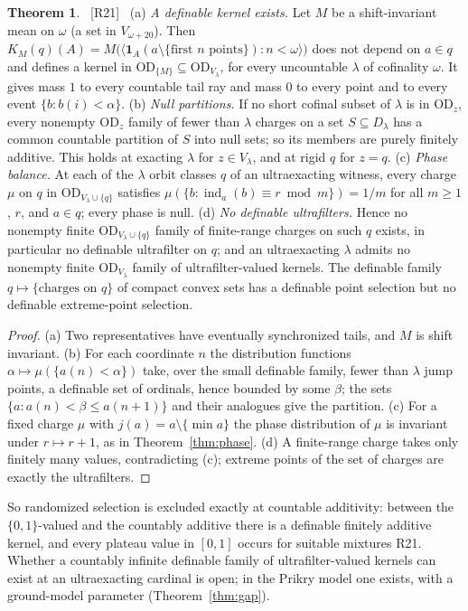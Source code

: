 \documentclass[11pt,letterpaper]{article}
\theoremstyle{definition}
\newtheorem{theorem}[definition]{Theorem}
\numberwithin{equation}{section}
\newcommand{\OD}{\mathrm{OD}}
\newcommand{\ch}{\operatorname{ind}}
\newcommand{\src}[1]{\unskip\ {\normalfont\small\sffamily\color{Olive}[#1]}\ }
\newcommand{\R}[1]{\textsf{R#1}}
\begin{document}
\begin{theorem}\label{thm:charges}\src{R21}
(a) \emph{A definable kernel exists.} Let $M$ be a shift-invariant mean on $\omega$ (a set in $V_{\omega+20}$). Then $K_M(q)(A)=M\bigl(\langle\mathbf 1_A(a\setminus\{\text{first }n\text{ points}\}):n<\omega\rangle\bigr)$ does not depend on $a\in q$ and defines a kernel in $\OD_{\{M\}}\subseteq\OD_{V_\lambda}$, for every uncountable $\lambda$ of cofinality $\omega$. It gives mass $1$ to every countable tail ray and mass $0$ to every point and to every event $\{b:b(i)<\alpha\}$.
(b) \emph{Null partitions.} If no short cofinal subset of $\lambda$ is in $\OD_z$, every nonempty $\OD_z$ family of fewer than $\lambda$ charges on a set $S\subseteq D_\lambda$ has a common countable partition of $S$ into null sets; so its members are purely finitely additive. This holds at exacting $\lambda$ for $z\in V_\lambda$, and at rigid $q$ for $z=q$.
(c) \emph{Phase balance.} At each of the $\lambda$ orbit classes $q$ of an ultraexacting witness, every charge $\mu$ on $q$ in $\OD_{V_\lambda\cup\{q\}}$ satisfies $\mu(\{b:\ch_a(b)\equiv r\bmod m\})=1/m$ for all $m\ge1$, $r$, and $a\in q$; every phase is null.
(d) \emph{No definable ultrafilters.} Hence no nonempty finite $\OD_{V_\lambda\cup\{q\}}$ family of finite-range charges on such $q$ exists, in particular no definable ultrafilter on $q$; and an ultraexacting $\lambda$ admits no nonempty finite $\OD_{V_\lambda}$ family of ultrafilter-valued kernels. The definable family $q\mapsto\{\text{charges on }q\}$ of compact convex sets has a definable point selection but no definable extreme-point selection.
\end{theorem}

\begin{proof}
(a) Two representatives have eventually synchronized tails, and $M$ is shift invariant. (b) For each coordinate $n$ the distribution functions $\alpha\mapsto\mu(\{a(n)<\alpha\})$ take, over the small definable family, fewer than $\lambda$ jump points, a definable set of ordinals, hence bounded by some $\beta$; the sets $\{a:a(n)<\beta\le a(n+1)\}$ and their analogues give the partition. (c) For a fixed charge $\mu$ with $j(a)=a\setminus\{\min a\}$ the phase distribution of $\mu$ is invariant under $r\mapsto r+1$, as in Theorem~\ref{thm:phase}. (d) A finite-range charge takes only finitely many values, contradicting (c); extreme points of the set of charges are exactly the ultrafilters.
\end{proof}

So randomized selection is excluded exactly at countable additivity: between the $\{0,1\}$-valued and the countably additive there is a definable finitely additive kernel, and every plateau value in $[0,1]$ occurs for suitable mixtures \R{21}. Whether a countably infinite definable family of ultrafilter-valued kernels can exist at an ultraexacting cardinal is open; in the Prikry model one exists, with a ground-model parameter (Theorem~\ref{thm:gap}).
\end{document}
